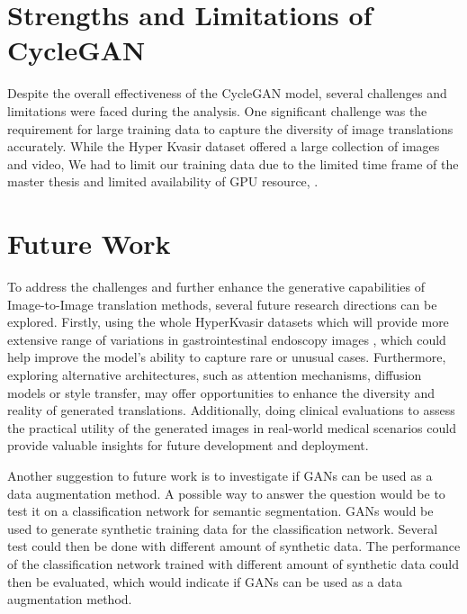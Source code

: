 \documentclass[UKenglish,12pt]{master-style}
\begin{document}
\section{Strengths and Limitations of CycleGAN}
Despite the overall effectiveness of the CycleGAN model, several challenges and limitations were faced during the analysis. One significant challenge was the requirement for large training data to capture the diversity of image translations accurately. While the Hyper Kvasir dataset offered a large collection of images and video, We had to limit our training data due to the limited time frame of the master thesis and limited availability of GPU resource, . 

\section{Future Work} 
To address the challenges and further enhance the generative capabilities of Image-to-Image translation methods, several future research directions can be explored. Firstly, using the whole HyperKvasir datasets which will provide more extensive range of variations in gastrointestinal endoscopy images , which could help improve the model's ability to capture rare or unusual cases. Furthermore, exploring alternative architectures, such as attention mechanisms, diffusion models or style transfer, may offer opportunities to enhance the diversity and reality of generated translations. Additionally, doing clinical evaluations to assess the practical utility of the generated images in real-world medical scenarios could provide valuable insights for future development and deployment.

Another suggestion to future work is to investigate if GANs can be used as a data augmentation method. A possible way to answer the question would be to test it on a classification network for semantic segmentation. GANs would be used to generate synthetic training data for the classification network. Several test could then be done with different amount of synthetic data. The performance of the classification network trained with different amount of synthetic data could then be evaluated, which would indicate if GANs can be used as a data augmentation method.
\end{document}
